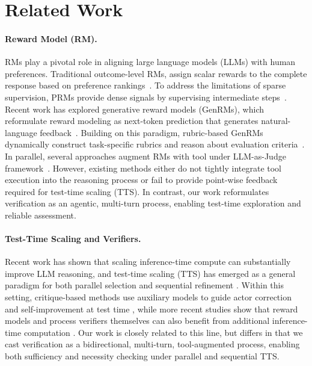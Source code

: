\documentclass[11pt]{article}
\begin{document}
\section{Related Work}

\paragraph{Reward Model (RM).}
RMs play a pivotal role in aligning large language models (LLMs) with human preferences. 
Traditional outcome-level RMs, assign scalar rewards to the complete response based on preference rankings~\citep{zhong2025comprehensivesurveyrewardmodels,wang2024secretsrlhflargelanguage}.
To address the limitations of sparse supervision, PRMs provide dense signals by supervising intermediate steps~\citep{zhang2025lessonsdevelopingprocessreward,chen2025better,Lightman:2024:MATH500,cui2025processreinforcementimplicitrewards}.
Recent work has explored generative reward models (GenRMs), which reformulate reward modeling as next-token prediction that generates natural-language feedback~\citep{mahan2024GRM,chen2025judgelrm,zhang2024generative-verifiers,li2025genRMs}.
Building on this paradigm, rubric-based GenRMs  dynamically construct task-specific rubrics and reason about evaluation criteria~\citep{guo2025critiq,liu2025inference-time-scaling, Chen:2025:RM-R1,guo2025reward-reasoning-model}.
In parallel, several approaches augment RMs with tool under LLM-as-Judge framework~\citep{Li:2024:ToolRM,Xu:2025:LLMJudgeTIR,peng2025agenticrewardmodeling}.
However, existing methods either do not tightly integrate tool execution into the reasoning process or fail to provide point-wise feedback required for test-time scaling (TTS).
In contrast, our work reformulates verification as an agentic, multi-turn process, enabling test-time exploration and reliable assessment.

\paragraph{Test-Time Scaling and Verifiers.}
Recent work has shown that scaling inference-time compute can substantially improve LLM reasoning, and test-time scaling (TTS) has emerged as a general paradigm for both parallel selection and sequential refinement \cite{muennighoff2025s1}. Within this setting, critique-based methods use auxiliary models to guide actor correction and self-improvement at test time \cite{xi2024enhancing}, while more recent studies show that reward models and process verifiers themselves can also benefit from additional inference-time computation \cite{liu2025inference,khalifa2025process}. Our work is closely related to this line, but differs in that we cast verification as a bidirectional, multi-turn, tool-augmented process, enabling both sufficiency and necessity checking under parallel and sequential TTS.
\end{document}
